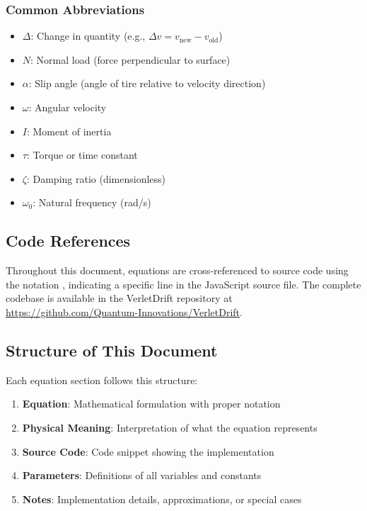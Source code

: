 \subsubsection{Common Abbreviations}
\begin{itemize}
  \item $\Delta$: Change in quantity (e.g., $\Delta v = v_{\text{new}} - v_{\text{old}}$)
  \item $N$: Normal load (force perpendicular to surface)
  \item $\alpha$: Slip angle (angle of tire relative to velocity direction)
  \item $\omega$: Angular velocity
  \item $I$: Moment of inertia
  \item $\tau$: Torque or time constant
  \item $\zeta$: Damping ratio (dimensionless)
  \item $\omega_0$: Natural frequency (rad/s)
\end{itemize}

\subsection{Code References}

Throughout this document, equations are cross-referenced to source code using the notation , indicating a specific line in the JavaScript source file. The complete codebase is available in the VerletDrift repository at \url{https://github.com/Quantum-Innovations/VerletDrift}.

\subsection{Structure of This Document}

Each equation section follows this structure:

\begin{enumerate}
  \item \textbf{Equation}: Mathematical formulation with proper notation
  \item \textbf{Physical Meaning}: Interpretation of what the equation represents
  \item \textbf{Source Code}: Code snippet showing the implementation
  \item \textbf{Parameters}: Definitions of all variables and constants
  \item \textbf{Notes}: Implementation details, approximations, or special cases
\end{enumerate}

